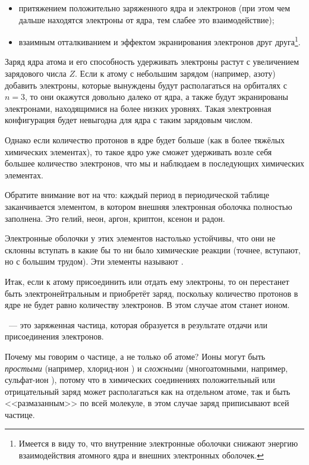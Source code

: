 \begin{itemize}
    \item притяжением положительно заряженного ядра и электронов (при этом чем дальше находятся электроны от ядра, тем слабее это взаимодействие);
    \item взаимным отталкиванием и эффектом экранирования электронов друг друга\footnote{Имеется в виду то, что внутренние электронные оболочки снижают энергию взаимодействия атомного ядра и внешних электронных оболочек.}.
\end{itemize}

Заряд ядра атома и его способность удерживать электроны растут с увеличением зарядового числа $Z$. Если к атому с небольшим зарядом (например, азоту) добавить электроны, которые вынуждены будут располагаться на орбиталях с $n = 3$, то они окажутся довольно далеко от ядра, а также будут экранированы электронами, находящимися на более низких уровнях. Такая электронная конфигурация будет невыгодна для ядра с таким зарядовым числом.

Однако если количество протонов в ядре будет больше (как в более тяжёлых химических элементах), то такое ядро уже сможет удерживать возле себя большее количество электронов, что мы и наблюдаем в последующих химических элементах.

Обратите внимание вот на что: каждый период в периодической таблице заканчивается элементом, в котором внешняя электронная оболочка полностью заполнена. Это гелий, неон, аргон, криптон, ксенон и радон.

Электронные оболочки у этих элементов настолько устойчивы, что они не склонны вступать в какие бы то ни было химические реакции (точнее, вступают, но с большим трудом). Эти элементы называют .

Итак, если к атому присоединить или отдать ему электроны, то он перестанет быть электронейтральным и приобретёт заряд, поскольку количество протонов в ядре не будет равно количеству электронов. В этом случае атом станет ионом.

~--- это заряженная частица, которая образуется в результате отдачи или присоединения электронов.

Почему мы говорим о частице, а не только об атоме? Ионы могут быть \emph{простыми} (например, хлорид-ион ) и \emph{сложными} (многоатомными, например, сульфат-ион ), потому что в химических соединениях положительный или отрицательный заряд может располагаться как на отдельном атоме, так и быть <<размазанным>> по всей молекуле, в этом случае заряд приписывают всей частице.


